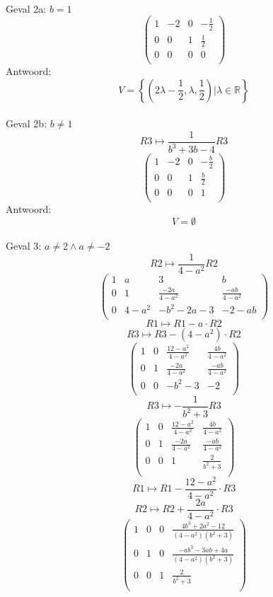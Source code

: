 \documentclass[lineaire_algebra_oplossingen.tex]{subfiles}
\begin{document}
\\Geval 2a: $b=1$
\[
\begin{pmatrix}
1 & -2 & 0 & -\frac{1}{2}\\
0 & 0 & 1 & \frac{1}{2}\\
0 & 0 & 0 & 0\\
\end{pmatrix}
\]
Antwoord:
\[
V= \left\lbrace \left(2\lambda-\frac{1}{2},\lambda,\frac{1}{2}\right)| \lambda \in \mathbb{R}\right\rbrace
\]
\\Geval 2b: $b \neq 1$
\[ R3 \longmapsto \frac{1}{b^3+3b-4}R3 \]
\[
\begin{pmatrix}
1 & -2 & 0 & -\frac{b}{2}\\
0 & 0 & 1 & \frac{b}{2}\\
0 & 0 & 0 & 1\\
\end{pmatrix}
\]
Antwoord:
\[
V= \emptyset
\]
\\Geval 3: $a\neq 2 \wedge a \neq -2$ 
\[ R2 \longmapsto \frac{1}{4-a^{2}}R2 \]
\[
\begin{pmatrix}
1 & a & 3 & b\\
0 & 1 & \frac{-2a}{4-a^{2}} & \frac{-ab}{4-a^{2}}\\
0 & 4-a^{2} & -b^{2}-2a-3 & -2-ab\\
\end{pmatrix}
\]
\[ R1 \longmapsto R1 - a \cdot R2 \]
\[ R3 \longmapsto R3 - (4-a^{2}) \cdot R2 \]
\[
\begin{pmatrix}
1 & 0 & \frac{12-a^{2}}{4-a^{2}} & \frac{4b}{4-a^{2}}\\
0 & 1 & \frac{-2a}{4-a^{2}} & \frac{-ab}{4-a^{2}}\\
0 & 0 & -b^{2}-3 & -2\\
\end{pmatrix}
\]
\[ R3 \longmapsto -\frac{1}{b^{2}+3}R3\]
\[
\begin{pmatrix}
1 & 0 & \frac{12-a^{2}}{4-a^{2}} & \frac{4b}{4-a^{2}}\\
0 & 1 & \frac{-2a}{4-a^{2}} & \frac{-ab}{4-a^{2}}\\
0 & 0 & 1 & \frac{2}{b^{2}+3}\\
\end{pmatrix}
\]
\[ R1 \longmapsto R1 - \frac{12-a^{2}}{4-a^{2}} \cdot R3 \]
\[ R2 \longmapsto R2 + \frac{2a}{4-a^{2}} \cdot R3 \]
\[
\begin{pmatrix}
1 & 0 & 0 & \frac{4b^{3}+2a^{2}-12}{(4-a^{2})(b^{2}+3)}\\
0 & 1 & 0 & \frac{-ab^{3}-3ab+4a}{(4-a^{2})(b^{2}+3)}\\
0 & 0 & 1 & \frac{2}{b^{2}+3}\\
\end{pmatrix}
\]
\end{document}
